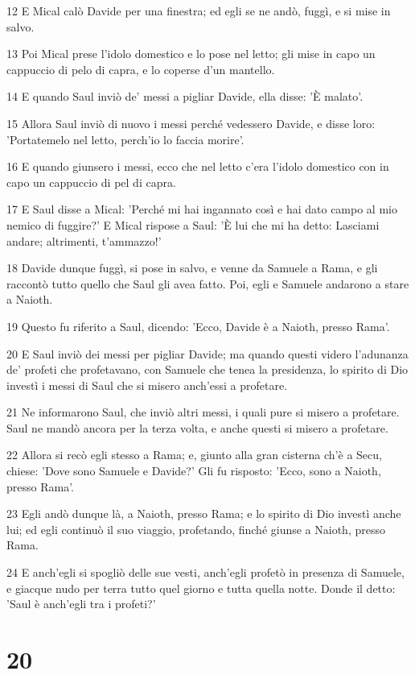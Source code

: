 \par 12 E Mical calò Davide per una finestra; ed egli se ne andò, fuggì, e si mise in salvo.
\par 13 Poi Mical prese l'idolo domestico e lo pose nel letto; gli mise in capo un cappuccio di pelo di capra, e lo coperse d'un mantello.
\par 14 E quando Saul inviò de' messi a pigliar Davide, ella disse: 'È malato'.
\par 15 Allora Saul inviò di nuovo i messi perché vedessero Davide, e disse loro: 'Portatemelo nel letto, perch'io lo faccia morire'.
\par 16 E quando giunsero i messi, ecco che nel letto c'era l'idolo domestico con in capo un cappuccio di pel di capra.
\par 17 E Saul disse a Mical: 'Perché mi hai ingannato così e hai dato campo al mio nemico di fuggire?' E Mical rispose a Saul: 'È lui che mi ha detto: Lasciami andare; altrimenti, t'ammazzo!'
\par 18 Davide dunque fuggì, si pose in salvo, e venne da Samuele a Rama, e gli raccontò tutto quello che Saul gli avea fatto. Poi, egli e Samuele andarono a stare a Naioth.
\par 19 Questo fu riferito a Saul, dicendo: 'Ecco, Davide è a Naioth, presso Rama'.
\par 20 E Saul inviò dei messi per pigliar Davide; ma quando questi videro l'adunanza de' profeti che profetavano, con Samuele che tenea la presidenza, lo spirito di Dio investì i messi di Saul che si misero anch'essi a profetare.
\par 21 Ne informarono Saul, che inviò altri messi, i quali pure si misero a profetare. Saul ne mandò ancora per la terza volta, e anche questi si misero a profetare.
\par 22 Allora si recò egli stesso a Rama; e, giunto alla gran cisterna ch'è a Secu, chiese: 'Dove sono Samuele e Davide?' Gli fu risposto: 'Ecco, sono a Naioth, presso Rama'.
\par 23 Egli andò dunque là, a Naioth, presso Rama; e lo spirito di Dio investì anche lui; ed egli continuò il suo viaggio, profetando, finché giunse a Naioth, presso Rama.
\par 24 E anch'egli si spogliò delle sue vesti, anch'egli profetò in presenza di Samuele, e giacque nudo per terra tutto quel giorno e tutta quella notte. Donde il detto: 'Saul è anch'egli tra i profeti?'

\chapter{20}


